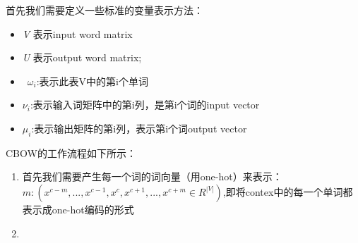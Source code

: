 	首先我们需要定义一些标准的变量表示方法：
	
	\begin{itemize}
		\item \emph{V} 表示input word matrix
		\item \emph{U} 表示output word matrix;
		\item \ $\omega _i$:表示此表V中的第i个单词
		\item $\nu_i$:表示输入词矩阵中的第i列，是第i个词的input vector
		\item $\mu_i$:表示输出矩阵的第i列，表示第i个词output vector
	
    \end{itemize}	
    
    CBOW的工作流程如下所示：
    \begin{enumerate}
    	\item 首先我们需要产生每一个词的词向量（用one-hot）来表示：$m:(x^{c-m},...,x^{c-1},x^{c},x^{c+1},...,x^{c+m} \in R^{|V|})$,即将contex中的每一个单词都表示成one-hot编码的形式
    	\item 
	\end{enumerate}
	
	
	
	
	
	
	
	
	
	
	
	
	
	
	
	
	
	
	
	
	
	
	
	
	
	
	
	
	    	
	
	